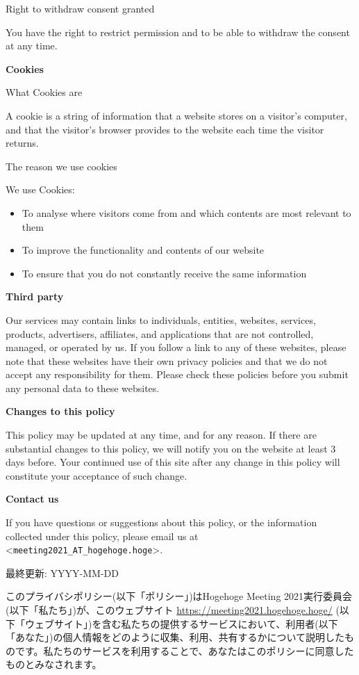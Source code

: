 \documentclass[titlepage,10pt,a4paper,uplatex]{jsbook}
\newenvironment{content}{\begin{shaded}\vspace{-1em}\raggedright\ttfamily\footnotesize\setlength{\baselineskip}{1.4em}}{\end{shaded}\vspace{-1em}}
\renewcommand{\textbf}[1]{{\bfseries\sffamily#1}}
\begin{document}
\begin{content}
{\Large Right to withdraw consent granted}

You have the right to restrict permission and to be able to withdraw the consent at any time.

\textbf{\Large Cookies}

{\Large What Cookies are}

A cookie is a string of information that a website stores on a visitor's computer, and that the visitor's browser provides to the website each time the visitor returns.

{\Large The reason we use cookies}

We use Cookies:

\begin{itemize}
\item To analyse where visitors come from and which contents are most relevant to them
\item To improve the functionality and contents of our website
\item To ensure that you do not constantly receive the same information
\end{itemize}

\textbf{\Large Third party}

Our services may contain links to individuals, entities, websites, services, products, advertisers, affiliates, and applications that are not controlled, managed, or operated by us. If you follow a link to any of these websites, please note that these websites have their own privacy policies and that we do not accept any responsibility for them. Please check these policies before you submit any personal data to these websites.

\textbf{\Large Changes to this policy}

This policy may be updated at any time, and for any reason. If there are substantial changes to this policy, we will notify you on the website at least 3 days before. Your continued use of this site after any change in this policy will constitute your acceptance of such change.

\textbf{\Large Contact us}

If you have questions or suggestions about this policy, or the information collected under this policy, please email us at {\textless}\texttt{meeting2021\_AT\_hogehoge.hoge}{\textgreater}.

最終更新: YYYY-MM-DD

このプライバシポリシー(以下「ポリシー」)はHogehoge Meeting 2021実行委員会(以下「私たち」)が、このウェブサイト \url{https://meeting2021.hogehoge.hoge/} (以下「ウェブサイト」)を含む私たちの提供するサービスにおいて、利用者(以下「あなた」)の個人情報をどのように収集、利用、共有するかについて説明したものです。私たちのサービスを利用することで、あなたはこのポリシーに同意したものとみなされます。


\end{content}
\end{document}
